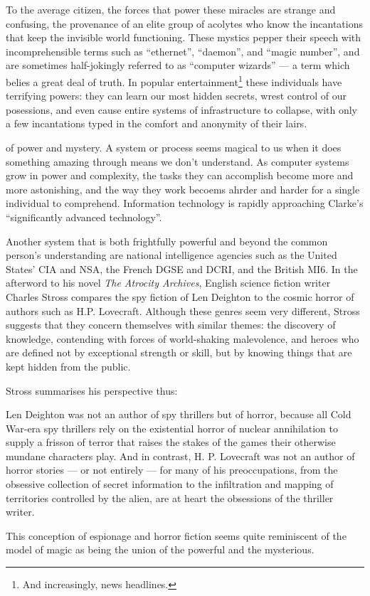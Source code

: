\documentclass[a4paper,nobib]{tufte-handout}
\begin{document}
To the average citizen, the forces that power these miracles are strange and confusing, the provenance of an elite group of acolytes who know the incantations that keep the invisible world functioning. These mystics pepper their speech with incomprehensible terms such as ``ethernet'', ``daemon'', and ``magic number'', and are sometimes half-jokingly referred to as ``computer wizards'' --- a term which belies a great deal of truth. In popular entertainment\footnote{And increasingly, news headlines.} these individuals have terrifying powers: they can learn our most hidden secrets, wrest control of our posessions, and even cause entire systems of infrastructure to collapse, with only a few incantations typed in the comfort and anonymity of their lairs.

 of power and mystery. A system or process seems magical to us when it does something amazing through means we don't understand. As computer systems grow in power and complexity, the tasks they can accomplish become more and more astonishing, and the way they work becoems ahrder and harder for a single individual to comprehend. Information technology is rapidly approaching Clarke's ``significantly advanced technology''.

Another system that is both frightfully powerful and beyond the common person's understanding are national intelligence agencies such as the United States' CIA and NSA, the French DGSE and DCRI, and the British MI6. In the afterword to his novel \emph{The Atrocity Archives}, English science fiction writer Charles Stross compares the spy fiction of Len Deighton to the cosmic horror of authors such as H.P. Lovecraft. Although these genres seem very different, Stross suggests that they concern themselves with similar themes: the discovery of knowledge, contending with forces of world-shaking malevolence, and heroes who are defined not by exceptional strength or skill, but by knowing things that are kept hidden from the public.\autocite{stross2008}

Stross summarises his perspective thus:
\begin{displayquote}
    Len Deighton was not an author of spy thrillers but of horror, because all Cold War-era spy thrillers rely on the existential horror of nuclear annihilation to supply a frisson of terror that raises the stakes of the games their otherwise mundane characters play. And in contrast, H. P. Lovecraft was not an author of horror stories --- or not entirely --- for many of his preoccupations, from the obsessive collection of secret information to the infiltration and mapping of territories controlled by the alien, are at heart the obsessions of the thriller writer.\autocite{stross2008}
\end{displayquote}
This conception of espionage and horror fiction seems quite reminiscent of the model of magic as being the union of the powerful and the mysterious.
\end{document}
